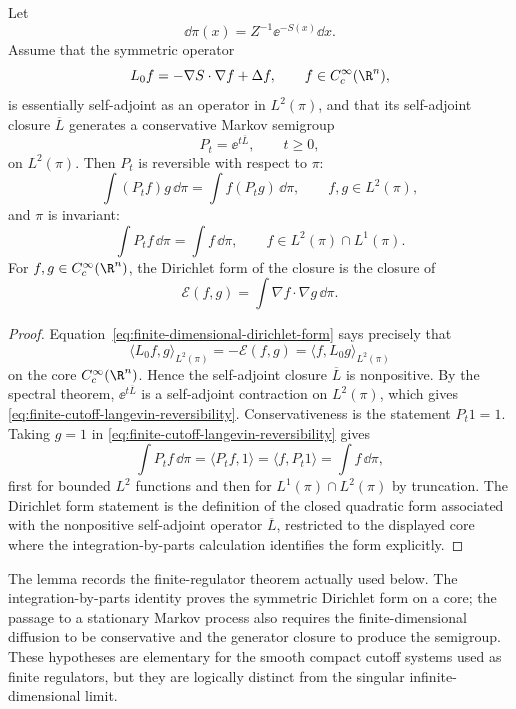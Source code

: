 \begin{lemma}
\label{lem:finite-cutoff-langevin-reversibility}
Let
\[
  \dd\pi(x)=Z^{-1}\ee^{-S(x)}\dd x .
\]
Assume that the symmetric operator
\[
  L_0 f=-\nabla S\cdot\nabla f+\Delta f,\qquad
  f\in C_c^\infty(\R^n),
\]
is essentially self-adjoint as an operator in \(L^2(\pi)\), and that its
self-adjoint closure \(\overline L\) generates a conservative Markov
semigroup
\[
  P_t=\ee^{t\overline L},\qquad t\ge0,
\]
on \(L^2(\pi)\).  Then \(P_t\) is reversible with respect to \(\pi\):
\begin{equation}
  \int (P_t f)g\,\dd\pi
  =
  \int f(P_t g)\,\dd\pi ,
  \qquad f,g\in L^2(\pi),
  \label{eq:finite-cutoff-langevin-reversibility}
\end{equation}
and \(\pi\) is invariant:
\begin{equation}
  \int P_t f\,\dd\pi=\int f\,\dd\pi ,
  \qquad f\in L^2(\pi)\cap L^1(\pi).
  \label{eq:finite-cutoff-langevin-semigroup-invariance}
\end{equation}
For \(f,g\in C_c^\infty(\R^n)\), the Dirichlet form of the closure is the
closure of
\[
  \mathcal E(f,g)
  =
  \int \nabla f\cdot\nabla g\,\dd\pi .
\]
\end{lemma}

\begin{proof}
Equation~\eqref{eq:finite-dimensional-dirichlet-form} says precisely that
\[
  \langle L_0 f,g\rangle_{L^2(\pi)}
  =
  -\mathcal E(f,g)
  =
  \langle f,L_0 g\rangle_{L^2(\pi)}
\]
on the core \(C_c^\infty(\R^n)\).  Hence the self-adjoint closure
\(\overline L\) is nonpositive.  By the spectral theorem,
\(\ee^{t\overline L}\) is a self-adjoint contraction on \(L^2(\pi)\), which
gives \eqref{eq:finite-cutoff-langevin-reversibility}.  Conservativeness is
the statement \(P_t1=1\).  Taking \(g=1\) in
\eqref{eq:finite-cutoff-langevin-reversibility} gives
\[
  \int P_t f\,\dd\pi
  =
  \langle P_t f,1\rangle
  =
  \langle f,P_t1\rangle
  =
  \int f\,\dd\pi ,
\]
first for bounded \(L^2\) functions and then for
\(L^1(\pi)\cap L^2(\pi)\) by truncation.  The Dirichlet form statement is the
definition of the closed quadratic form associated with the nonpositive
self-adjoint operator \(\overline L\), restricted to the displayed core
where the integration-by-parts calculation identifies the form explicitly.
\end{proof}

The lemma records the finite-regulator theorem actually used below.  The
integration-by-parts identity proves the symmetric Dirichlet form on a core;
the passage to a stationary Markov process also requires the finite-dimensional
diffusion to be conservative and the generator closure to produce the
semigroup.  These hypotheses are elementary for the smooth compact cutoff
systems used as finite regulators, but they are logically distinct from the
singular infinite-dimensional limit.

